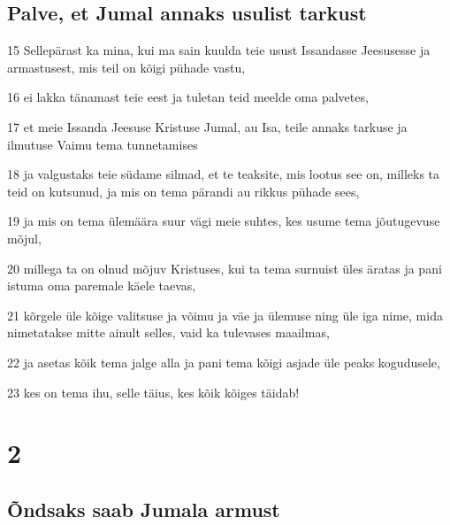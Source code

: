 \section*{Palve, et Jumal annaks usulist tarkust}

\par 15 Sellepärast ka mina, kui ma sain kuulda teie usust Issandasse Jeesusesse ja armastusest, mis teil on kõigi pühade vastu,
\par 16 ei lakka tänamast teie eest ja tuletan teid meelde oma palvetes,
\par 17 et meie Issanda Jeesuse Kristuse Jumal, au Isa, teile annaks tarkuse ja ilmutuse Vaimu tema tunnetamises
\par 18 ja valgustaks teie südame silmad, et te teaksite, mis lootus see on, milleks ta teid on kutsunud, ja mis on tema pärandi au rikkus pühade sees,
\par 19 ja mis on tema ülemäära suur vägi meie suhtes, kes usume tema jõutugevuse mõjul,
\par 20 millega ta on olnud mõjuv Kristuses, kui ta tema surnuist üles äratas ja pani istuma oma paremale käele taevas,
\par 21 kõrgele üle kõige valitsuse ja võimu ja väe ja ülemuse ning üle iga nime, mida nimetatakse mitte ainult selles, vaid ka tulevases maailmas,
\par 22 ja asetas kõik tema jalge alla ja pani tema kõigi asjade üle peaks kogudusele,
\par 23 kes on tema ihu, selle täius, kes kõik kõiges täidab!


\chapter{2}

\section*{Õndsaks saab Jumala armust}

